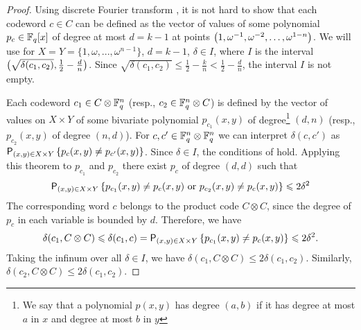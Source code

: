 \documentclass[11pt]{article}
\newcommand{\PP}{\mathsf{P}}
\begin{document}
\begin{proof}
    Using discrete Fourier transform \cite[Theorem 6.1.5]{book:AlgCodes}, it is not hard to show that each codeword $c\in C$ can be defined as the vector of values of some polynomial $p_c\in \mathbb{F}_q[x]$ of degree at most $d=k-1$ at points $\left(1,\omega^{-1},\omega^{-2},\ldots,\omega^{1-n}\right)$. 
    We will use \cite[Theorem 9]{Polishchuk:1994} for $X=Y=\{1,\omega,...,\omega^{n-1}\}$, $d=k-1$, $\delta \in I$, where $I$ is the interval $\bigl(\sqrt{\delta(c_1,c_2)},\frac 12-\frac d n\bigr)$. 
    Since $\sqrt{\delta(c_1,c_2)}\le \frac 12-\frac kn<\frac{1}{2}-\frac{d}{n}$, the interval $I$ is not empty.
    
    Each codeword $c_1\in C\otimes \mathbb{F}_q^n$ (resp., $c_2\in \mathbb{F}_q^n\otimes C$) is defined by the vector of values on $X\times Y$ of some bivariate polynomial $p_{c_1}(x,y)$ of degree\footnote{We say that a polynomial $p(x,y)$ has degree $(a,b)$ if it has degree at most $a$ in $x$ and degree at most $b$ in $y$} $(d,n)$ (resp., $p_{c_2}(x,y)$ of degree $(n,d)$).
    For $c,c'\in \mathbb{F}_q^n\otimes \mathbb{F}_q^n$ we can interpret $\delta(c,c')$ as $\PP_{(x,y)\in X\times Y}\fbr{p_{c}(x,y)\ne p_{c'}(x,y)}$. 
    Since $\delta\in I$, the conditions of \cite[Theorem 9]{Polishchuk:1994} hold. Applying this theorem to $p_{c_1}$ and $p_{c_2}$ there exist $p_c$ of degree $(d,d)$ such that
    \begin{equation*}
      \PP_{(x,y)\in X\times Y}\fbr{p_{c_1}(x,y)\ne p_{c}(x,y)\mbox{ or }p_{c_2}(x,y)\ne p_{c}(x,y)}\le 2\delta^2  
    \end{equation*}
    The corresponding word $c$ belongs to the product code $C\otimes C$, since the degree of $p_c$ in each variable is bounded by $d$.
    Therefore, we have
    $$\delta(c_1,C\otimes C)\le \delta(c_1,c)=\PP_{(x,y)\in X\times Y}\fbr{p_{c_1}(x,y)\ne p_{c}(x,y)}\le 2\delta^2.$$
    Taking the infinum over all $\delta\in I$, we have $\delta(c_1,C\otimes C)\le 2\delta(c_1,c_2)$. Similarly, $\delta(c_2,C\otimes C)\le 2\delta(c_1,c_2)$.
\end{proof}
\end{document}
